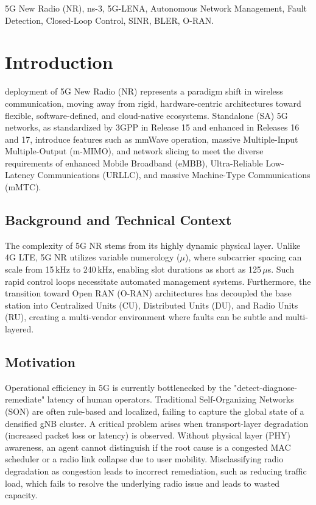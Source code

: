 \documentclass[journal]{IEEEtran}
\begin{document}
\begin{IEEEkeywords}
5G New Radio (NR), ns-3, 5G-LENA, Autonomous Network Management, Fault Detection, Closed-Loop Control, SINR, BLER, O-RAN.
\end{IEEEkeywords}

\section{Introduction}

 deployment of 5G New Radio (NR) represents a paradigm shift in wireless communication, moving away from rigid, hardware-centric architectures toward flexible, software-defined, and cloud-native ecosystems. Standalone (SA) 5G networks, as standardized by 3GPP in Release 15 and enhanced in Releases 16 and 17, introduce features such as mmWave operation, massive Multiple-Input Multiple-Output (m-MIMO), and network slicing to meet the diverse requirements of enhanced Mobile Broadband (eMBB), Ultra-Reliable Low-Latency Communications (URLLC), and massive Machine-Type Communications (mMTC).

\subsection{Background and Technical Context}
The complexity of 5G NR stems from its highly dynamic physical layer. Unlike 4G LTE, 5G NR utilizes variable numerology ($\mu$), where subcarrier spacing can scale from 15\,kHz to 240\,kHz, enabling slot durations as short as 125\,$\mu$s. Such rapid control loops necessitate automated management systems. Furthermore, the transition toward Open RAN (O-RAN) architectures has decoupled the base station into Centralized Units (CU), Distributed Units (DU), and Radio Units (RU), creating a multi-vendor environment where faults can be subtle and multi-layered.

\subsection{Motivation}
Operational efficiency in 5G is currently bottlenecked by the "detect-diagnose-remediate" latency of human operators. Traditional Self-Organizing Networks (SON) are often rule-based and localized, failing to capture the global state of a densified gNB cluster. A critical problem arises when transport-layer degradation (increased packet loss or latency) is observed. Without physical layer (PHY) awareness, an agent cannot distinguish if the root cause is a congested MAC scheduler or a radio link collapse due to user mobility. Misclassifying radio degradation as congestion leads to incorrect remediation, such as reducing traffic load, which fails to resolve the underlying radio issue and leads to wasted capacity.
\end{document}
